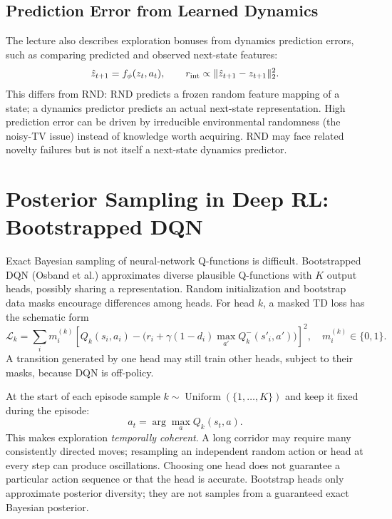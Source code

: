 \subsection{Prediction Error from Learned Dynamics}
The lecture also describes exploration bonuses from dynamics prediction errors, such as comparing predicted and observed next-state features:
\[
\hat z_{t+1}=f_\phi(z_t,a_t),\qquad
r_{\rm int}\propto\|\hat z_{t+1}-z_{t+1}\|_2^2.
\]
This differs from RND: RND predicts a frozen random feature mapping of a state; a dynamics predictor predicts an actual next-state representation. High prediction error can be driven by irreducible environmental randomness (the noisy-TV issue) instead of knowledge worth acquiring. RND may face related novelty failures but is not itself a next-state dynamics predictor.

\section{Posterior Sampling in Deep RL: Bootstrapped DQN}
Exact Bayesian sampling of neural-network Q-functions is difficult. Bootstrapped DQN (Osband et al.) approximates diverse plausible Q-functions with $K$ output heads, possibly sharing a representation. Random initialization and bootstrap data masks encourage differences among heads. For head $k$, a masked TD loss has the schematic form
\[
\mathcal L_k=
\sum_i m_i^{(k)}\left[
Q_k(s_i,a_i)-
\bigl(r_i+\gamma(1-d_i)\max_{a'}Q_k^{-}(s'_i,a')\bigr)
\right]^2,\quad m_i^{(k)}\in\{0,1\}.
\]
A transition generated by one head may still train other heads, subject to their masks, because DQN is off-policy.

At the start of each episode sample $k\sim\operatorname{Uniform}(\{1,\ldots,K\})$ and keep it fixed during the episode:
\[
a_t=\arg\max_a Q_k(s_t,a).
\]
This makes exploration \emph{temporally coherent}. A long corridor may require many consistently directed moves; resampling an independent random action or head at every step can produce oscillations. Choosing one head does not guarantee a particular action sequence or that the head is accurate. Bootstrap heads only approximate posterior diversity; they are not samples from a guaranteed exact Bayesian posterior.

